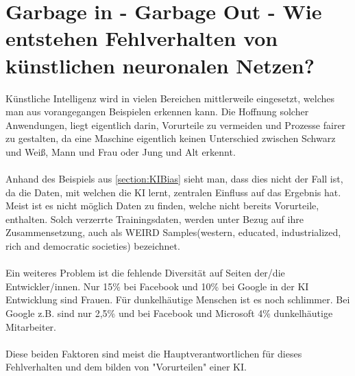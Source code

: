 \documentclass[12pt,oneside,a4paper,parskip]{scrbook}
\begin{document}
\section{Garbage in - Garbage Out - Wie entstehen Fehlverhalten von künstlichen neuronalen Netzen?}
Künstliche Intelligenz wird in vielen Bereichen mittlerweile eingesetzt, welches man aus vorangegangen Beispielen erkennen kann. Die Hoffnung solcher Anwendungen, liegt eigentlich darin, Vorurteile zu vermeiden und Prozesse fairer zu gestalten, da eine Maschine eigentlich keinen Unterschied zwischen Schwarz und Weiß, Mann und Frau oder Jung und Alt erkennt.
\\\\
Anhand des Beispiels aus \ref{section:KIBias} sieht man, dass dies nicht der Fall ist, da die Daten, mit welchen die KI lernt, zentralen Einfluss auf das Ergebnis hat. Meist ist es nicht möglich Daten zu finden, welche nicht bereits Vorurteile, enthalten. Solch verzerrte Trainingsdaten, werden unter Bezug auf ihre Zusammensetzung, auch als WEIRD Samples(western, educated, industrialized, rich and democratic societies) bezeichnet.%
\\\\
Ein weiteres Problem ist die fehlende Diversität auf Seiten der/die Entwickler/innen. Nur 15\% bei Facebook und 10\% bei Google in der KI Entwicklung sind Frauen. Für dunkelhäutige Menschen ist es noch schlimmer. Bei Google z.B. sind nur 2,5\% und bei Facebook und Microsoft 4\% dunkelhäutige Mitarbeiter\cite{Discriminating}.
\\\\
Diese beiden Faktoren sind meist die Hauptverantwortlichen für dieses Fehlverhalten und dem bilden von "Vorurteilen" einer KI.
\end{document}

